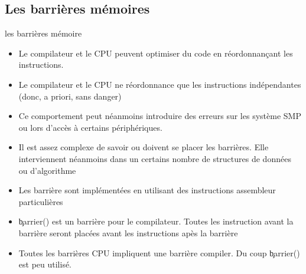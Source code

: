 \subsection{Les barrières mémoires}

\begin{frame}[fragile=singleslide]{les barrières mémoire}
  \begin{itemize} 
  \item  Le  compilateur  et  le  CPU peuvent  optimiser  du  code  en
    réordonnançant les instructions.
  \item Le compilateur et le  CPU ne réordonnance que les instructions
    indépendantes (donc, a priori, sans danger)
  \item Ce comportement peut  néanmoins introduire des erreurs sur les
    système SMP ou lors d'accès à certains périphériques.
  \item  Il est  assez complexe  de savoir  ou doivent  se  placer les
    barrières. Elle interviennent néanmoins dans un certains nombre de
    structures de données ou d'algorithme
  \item Les  barrière sont implémentées en  utilisant des instructions
    assembleur particulières
  \item \c{barrier()} est un barrière pour le compilateur.  Toutes les
    instruction   avant   la  barrière   seront   placées  avant   les
    instructions apès la barrière
  \item Toutes les barrières  CPU impliquent une barrière compiler. Du
    coup \c{barrier()} est peu utilisé.
  \end{itemize}
\end{frame}

